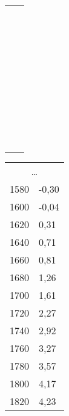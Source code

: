 \begin{footnotesize}
\begin{table}[h]
\begin{tabular}{c|c}
&\\&\\&\\&\\&\\&\\&\\&\\&\\&\\&\\&\\&\\&\\&\\&\\&\\&\\&\\&\\&\\&\\&\\&\\&\\&\\&\\&\\&\\&\\&\\&\\&\\&\\&\\&\\&\\&\\&\\&\\
\end{tabular}
\begin{tabular}{rl}
\multicolumn{2}{c}{\dots}\\
1580	&	-0,30\\
1600	&	-0,04\\
1620	&	0,31\\
1640	&	0,71\\
1660	&	0,81\\
1680	&	1,26\\
1700	&	1,61\\
1720	&	2,27\\
1740	&	2,92\\
1760	&	3,27\\
1780	&	3,57\\
1800	&	4,17\\
1820	&	4,23\\

\end{tabular}
\end{table}
\end{footnotesize}

